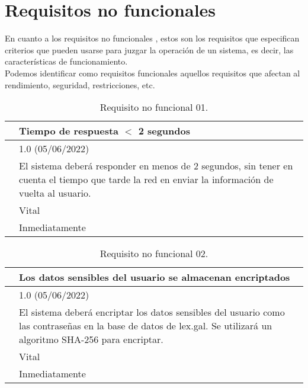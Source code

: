 \section{Requisitos no funcionales}

En cuanto a los requisitos no funcionales \cite{requisitos}, estos son los requisitos que especifican criterios que pueden usarse para juzgar la operación de un sistema, es decir, las características de funcionamiento.
\\

Podemos identificar como requisitos funcionales aquellos requisitos que afectan al rendimiento, seguridad, restricciones, etc.

\begin{table}[H]
\begin{center}
\begin{tabular}{|p{3cm}|p{10cm}|} \hline
\centering {\bf NFR-01} & Tiempo de respuesta $<$ 2 segundos  \\ \hline\hline
\centering {\bf Versión} & 1.0 (05/06/2022) \\ \hline
\centering {\bf Descripción} & El sistema deberá responder en menos de 2 segundos, sin tener en cuenta el tiempo que tarde la red en enviar la información de vuelta al usuario. \\ \hline
\centering {\bf Importancia} & Vital \\ \hline
\centering {\bf Urgencia} & Inmediatamente \\ \hline
\end{tabular}
\caption{Requisito no funcional 01.}
\label{enlaceNFR1}
\end{center}
\end{table}

\begin{table}[H]
\begin{center}
\begin{tabular}{|p{3cm}|p{10cm}|} \hline
\centering {\bf NFR-02} & Los datos sensibles del usuario se almacenan encriptados  \\ \hline\hline
\centering {\bf Versión} & 1.0 (05/06/2022) \\ \hline
\centering {\bf Descripción} & El sistema deberá encriptar los datos sensibles del usuario como las contraseñas en la base de datos de lex.gal. Se utilizará un algoritmo SHA-256 para encriptar. \\ \hline
\centering {\bf Importancia} & Vital \\ \hline
\centering {\bf Urgencia} & Inmediatamente \\ \hline
\end{tabular}
\caption{Requisito no funcional 02.}
\label{enlaceNFR2}
\end{center}
\end{table}

